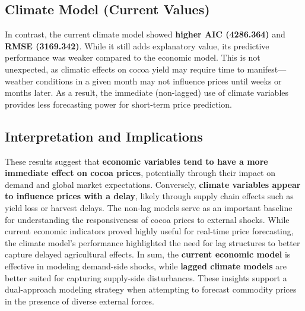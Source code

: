 \subsection{Climate Model (Current Values)}

In contrast, the current climate model showed \textbf{higher AIC (4286.364)} and \textbf{RMSE (3169.342)}. While it still adds explanatory value, its predictive performance was weaker compared to the economic model. This is not unexpected, as climatic effects on cocoa yield may require time to manifest—weather conditions in a given month may not influence prices until weeks or months later. As a result, the immediate (non-lagged) use of climate variables provides less forecasting power for short-term price prediction.

\subsection{Interpretation and Implications}

These results suggest that \textbf{economic variables tend to have a more immediate effect on cocoa prices}, potentially through their impact on demand and global market expectations. Conversely, \textbf{climate variables appear to influence prices with a delay}, likely through supply chain effects such as yield loss or harvest delays. The non-lag models serve as an important baseline for understanding the responsiveness of cocoa prices to external shocks. While current economic indicators proved highly useful for real-time price forecasting, the climate model's performance highlighted the need for lag structures to better capture delayed agricultural effects. In sum, the \textbf{current economic model} is effective in modeling demand-side shocks, while \textbf{lagged climate models} are better suited for capturing supply-side disturbances. These insights support a dual-approach modeling strategy when attempting to forecast commodity prices in the presence of diverse external forces.

